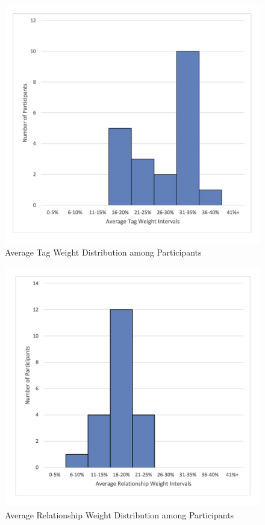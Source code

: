\begin{figure}[!h]
\begin{centering}
\includegraphics[scale=0.6]{pics/tag_weight_histogram.png}
\caption{Average Tag Weight Distribution among Participants}\label{fig:tag_weight_histogram}
\end{centering}
\end{figure}

\begin{figure}[!h]
\begin{centering}
\includegraphics[scale=0.6]{pics/relationship_weight_histogram.png}
\caption{Average Relationship Weight Distribution among Participants}\label{fig:relationship_weight_histogram}
\end{centering}
\end{figure}


